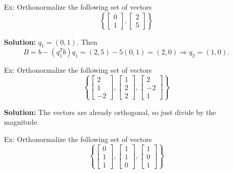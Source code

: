 \documentclass[reqno]{amsart}
\theoremstyle{definition}
\begin{document}
\begin{enumerate}
\item[Ex:  ]Orthonormalize the following set of vectors
%
\begin{equation*}
\left\lbrace\begin{bmatrix}
0\\
1
\end{bmatrix}, \begin{bmatrix}
2\\
5
\end{bmatrix}\right\rbrace
\end{equation*}

\textbf{Solution:  }
$\boxed{q_1 = (0, 1)}$.  Then
%
\begin{equation*}
B = b - (q_1^Tb)q_1 = (2, 5) - 5(0, 1) = \boxed{(2, 0)} \Rightarrow \boxed{q_2 = (1, 0)}.
\end{equation*}

\item[Ex:  ]  Orthonormalize the following set of vectors
%
\begin{equation*}
\left\lbrace\begin{bmatrix}
2\\
1\\
-2
\end{bmatrix}, \begin{bmatrix}
1\\
2\\
2
\end{bmatrix}, \begin{bmatrix}
2\\
-2\\
1
\end{bmatrix}\right\rbrace
\end{equation*}

\textbf{Solution:  }
The vectors are already orthogonal, so just divide by the magnitude.

\item[Ex:  ]Orthonormalize the following set of vectors
%
\begin{equation*}
\left\lbrace\begin{bmatrix}
0\\
1\\
1
\end{bmatrix}, \begin{bmatrix}
1\\
1\\
0
\end{bmatrix}, \begin{bmatrix}
1\\
0\\
1
\end{bmatrix}\right\rbrace
\end{equation*}


\end{enumerate}
\end{document}
